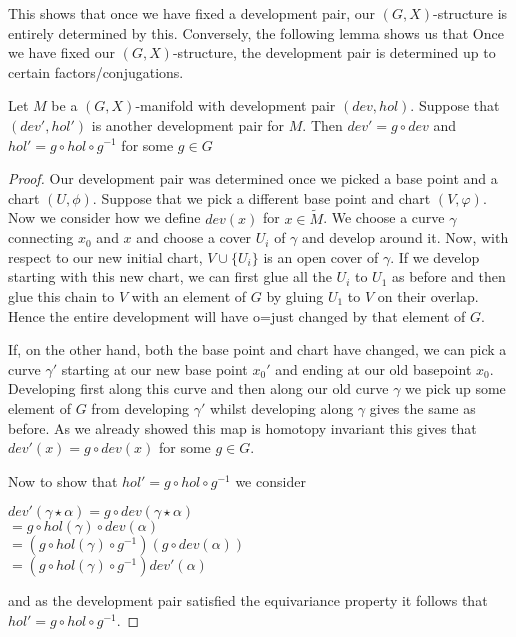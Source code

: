 This shows that once we have fixed a development pair, our $(G,X)$-structure is
entirely determined by this. Conversely, the following lemma shows us that Once
we have fixed our $(G,X)$-structure, the development pair is determined up to
certain factors/conjugations.

\begin{lemma}
    Let $M$ be a $(G,X)$-manifold with development pair $(dev, hol)$. Suppose that $(dev', hol')$ is
    another development pair for $M$. Then $dev' = g\circ dev$ and $hol' = g\circ hol \circ g^{-1}$
    for some $g \in G$
\end{lemma}
\begin{proof}
    Our development pair was determined once we picked a base point and a chart $(U, \phi)$. Suppose that
    we pick a different base point and chart $(V, \varphi)$. Now we consider how we define $dev(x)$ for $x \in \tilde{M}$.
    We choose a curve $\gamma$ connecting $x_0$ and $x$ and choose a cover $U_i$ of $\gamma$ and develop around it.
    Now, with respect to our new initial chart, $V \cup \{U_i\}$ is an open cover of $\gamma$. If we develop starting with this new chart,
    we can first glue all the $U_i$ to $U_1$ as before and then glue this chain to $V$ with an element of $G$ by gluing
    $U_1$ to $V$ on their overlap. Hence the entire development will have o=just changed by that element of $G$.

    If, on the other hand, both the base point and chart have changed, we can pick
    a curve $\gamma'$ starting at our new base point $x_0'$ and ending at our old
    basepoint $x_0$. Developing first along this curve and then along our old curve
    $\gamma$ we pick up some element of $G$ from developing $\gamma'$ whilst
    developing along $\gamma$ gives the same as before. As we already showed this
    map is homotopy invariant this gives that $dev'(x) = g\circ dev(x)$ for some $g
        \in G$.

    Now to show that $hol' = g\circ hol \circ g^{-1}$ we consider
    \begin{center}
        $dev'(\gamma \star \alpha) = g \circ dev(\gamma \star \alpha)$\\
        $= g\circ hol(\gamma) \circ dev(\alpha)$\\
        $= (g\circ hol(\gamma)\circ g^{-1})(g\circ dev(\alpha))$\\
        $= (g \circ hol(\gamma)\circ g^{-1})dev'(\alpha)$
    \end{center}
    and as the development pair satisfied the equivariance property it follows that
    $hol' = g\circ hol \circ g^{-1}$.
\end{proof}

